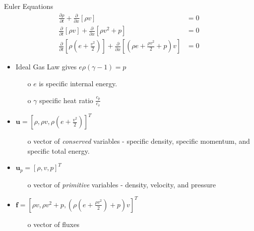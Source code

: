 \documentclass[10pt]{beamer}
\begin{document}
\begin{frame}{Euler Equations}
  \begin{align}
    \frac{\partial \rho}{\partial t}+\frac{\partial}{\partial x}[\rho v] &=0\label{eq:MassBalance}\\
    \frac{\partial}{\partial t}[\rho v]+\frac{\partial}{\partial x}[\rho v^2+p]&=0\label{eq:MomentaBalance}\\
    \frac{\partial}{\partial t}[\rho(e+\tfrac{v^2}{2})]+\frac{\partial}{\partial x}[(\rho e+\tfrac{\rho v^2}{2} +p)v]&=0\label{eq:EnergyBalance}
    \end{align} 
  \begin{itemize}
    \item Ideal Gas Law gives $e\rho(\gamma -1)=p$
    \begin{itemize}
      \item[o] $e$ is specific internal energy.  
      \item[o] $\gamma$ specific heat ratio $\frac{c_p}{c_v}$
    \end{itemize}
    \item $\textbf{u}=[\rho,\rho v,\rho(e+\tfrac{v^2}{2})]^T$
    \begin{itemize}
      \item[o] vector of \textit{conserved} variables - specific density, specific momentum, and specific total energy. 
    \end{itemize}
    \item $\textbf{u}_p=[\rho,v, p]^T$
    \begin{itemize}
      \item[o] vector of \textit{primitive} variables - density, velocity, and pressure
    \end{itemize}
    \item $\textbf{f} = [\rho v, \rho v^2 + p, (\rho(e+\tfrac{\rho v^2}{2})+p)v]^T$
    \begin{itemize}
      \item[o] vector of fluxes
    \end{itemize}
  \end{itemize}
\end{frame}
\end{document}
